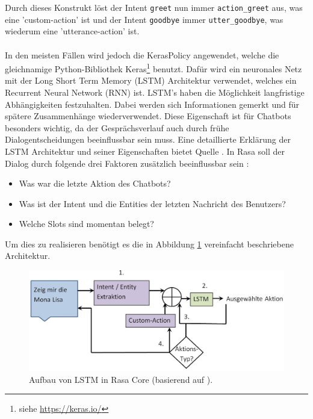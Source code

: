 Durch dieses Konstrukt löst der Intent \texttt{greet} nun immer \texttt{action\_greet} aus, was eine 'custom-action' ist und der Intent \texttt{goodbye} immer \texttt{utter\_goodbye}, was wiederum eine 'utterance-action' ist.\\
\\
In den meisten Fällen wird jedoch die KerasPolicy angewendet, welche die gleichnamige Python-Bibliothek Keras\footnote{siehe \href{https://keras.io/}{https://keras.io/}} benutzt. Dafür wird ein neuronales Netz mit der Long Short Term Memory (LSTM) Architektur verwendet, welches ein Recurrent Neural Network (RNN) ist. LSTM's haben die Möglichkeit langfristige Abhängigkeiten festzuhalten. Dabei werden sich Informationen gemerkt und für spätere Zusammenhänge wiederverwendet. Diese Eigenschaft ist für Chatbots besonders wichtig, da der Gesprächsverlauf auch durch frühe Dialogentscheidungen beeinflussbar sein muss. Eine detaillierte Erklärung der LSTM Architektur und seiner Eigenschaften bietet Quelle \cite{lstm}. In Rasa soll der Dialog durch folgende drei Faktoren zusätzlich beeinflussbar sein \cite{rasa}:
\begin{itemize}
	\setlength\itemsep{-0.6em}
	\item Was war die letzte Aktion des Chatbots?
	\item Was ist der Intent und die Entities der letzten Nachricht des Benutzers?
	\item Welche Slots sind momentan belegt?
\end{itemize} 
Um dies zu realisieren benötigt es die in Abbildung \ref{lstm} vereinfacht beschriebene Architektur.
\begin{figure}[htbp]
	\centerline{\includegraphics[width=1\linewidth]{figures/lstm.jpg}}
	\caption{Aufbau von LSTM in Rasa Core (basierend auf \cite{lstmrasa}).}
	\label{lstm}
\end{figure}
